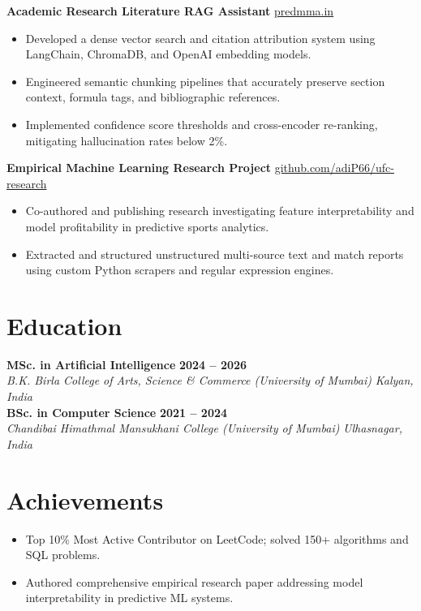 \documentclass[10pt,a4paper]{article}
\begin{document}
\textbf{Academic Research Literature RAG Assistant} \hfill \href{https://predmma.in}{predmma.in}
\begin{itemize}
    \item Developed a dense vector search and citation attribution system using LangChain, ChromaDB, and OpenAI embedding models.
    \item Engineered semantic chunking pipelines that accurately preserve section context, formula tags, and bibliographic references.
    \item Implemented confidence score thresholds and cross-encoder re-ranking, mitigating hallucination rates below 2\%.
\end{itemize}

\textbf{Empirical Machine Learning Research Project} \hfill \href{https://github.com/adiP66/ufc-research}{github.com/adiP66/ufc-research}
\begin{itemize}
    \item Co-authored and publishing research investigating feature interpretability and model profitability in predictive sports analytics.
    \item Extracted and structured unstructured multi-source text and match reports using custom Python scrapers and regular expression engines.
\end{itemize}

\section*{Education}
\textbf{MSc. in Artificial Intelligence} \hfill \textbf{2024 -- 2026} \\
\textit{B.K. Birla College of Arts, Science \& Commerce (University of Mumbai)} \hfill \textit{Kalyan, India} \\[3pt]
\textbf{BSc. in Computer Science} \hfill \textbf{2021 -- 2024} \\
\textit{Chandibai Himathmal Mansukhani College (University of Mumbai)} \hfill \textit{Ulhasnagar, India}

\section*{Achievements}
\begin{itemize}
    \item Top 10\% Most Active Contributor on LeetCode; solved 150+ algorithms and SQL problems.
    \item Authored comprehensive empirical research paper addressing model interpretability in predictive ML systems.
\end{itemize}
\end{document}
